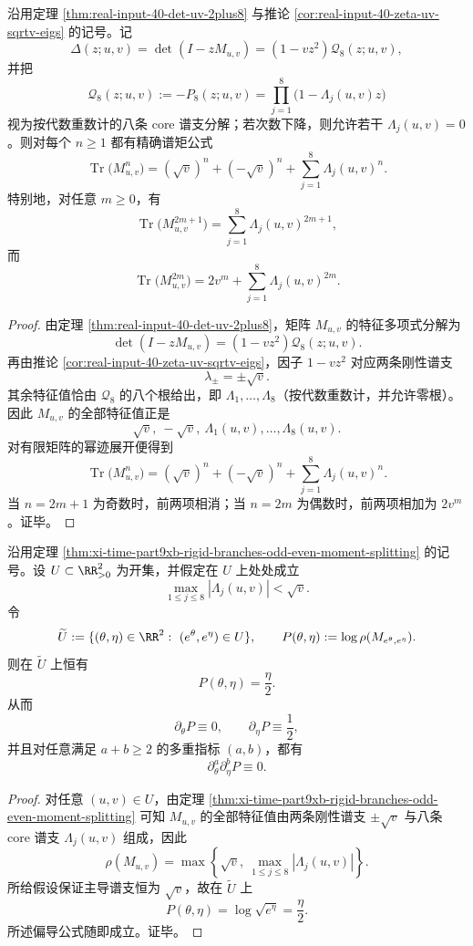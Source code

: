 \begin{theorem}[二维刚性谱支的奇偶矩完全分裂]\label{thm:xi-time-part9xb-rigid-branches-odd-even-moment-splitting}
沿用定理 \ref{thm:real-input-40-det-uv-2plus8} 与推论 \ref{cor:real-input-40-zeta-uv-sqrtv-eigs} 的记号。记
\[
\Delta(z;u,v)=\det(I-zM_{u,v})=(1-vz^2)\mathcal Q_8(z;u,v),
\]
并把
\[
\mathcal Q_8(z;u,v):=-P_8(z;u,v)=\prod_{j=1}^{8}\bigl(1-\Lambda_j(u,v)z\bigr)
\]
视为按代数重数计的八条 core 谱支分解；若次数下降，则允许若干 \(\Lambda_j(u,v)=0\)。则对每个 \(n\ge 1\) 都有精确谱矩公式
\[
\operatorname{Tr}\bigl(M_{u,v}^n\bigr)
=
(\sqrt v)^n+(-\sqrt v)^n+\sum_{j=1}^{8}\Lambda_j(u,v)^n.
\]
特别地，对任意 \(m\ge 0\)，有
\[
\operatorname{Tr}\bigl(M_{u,v}^{2m+1}\bigr)
=
\sum_{j=1}^{8}\Lambda_j(u,v)^{2m+1},
\]
而
\[
\operatorname{Tr}\bigl(M_{u,v}^{2m}\bigr)
=
2v^m+\sum_{j=1}^{8}\Lambda_j(u,v)^{2m}.
\]
\end{theorem}
\begin{proof}
由定理 \ref{thm:real-input-40-det-uv-2plus8}，矩阵 \(M_{u,v}\) 的特征多项式分解为
\[
\det(I-zM_{u,v})=(1-vz^2)\mathcal Q_8(z;u,v).
\]
再由推论 \ref{cor:real-input-40-zeta-uv-sqrtv-eigs}，因子 \(1-vz^2\) 对应两条刚性谱支
\[
\lambda_\pm=\pm\sqrt v.
\]
其余特征值恰由 \(\mathcal Q_8\) 的八个根给出，即 \(\Lambda_1,\dots,\Lambda_8\)（按代数重数计，并允许零根）。因此 \(M_{u,v}\) 的全部特征值正是
\[
\sqrt v,\ -\sqrt v,\ \Lambda_1(u,v),\dots,\Lambda_8(u,v).
\]
对有限矩阵的幂迹展开便得到
\[
\operatorname{Tr}\bigl(M_{u,v}^n\bigr)
=
(\sqrt v)^n+(-\sqrt v)^n+\sum_{j=1}^{8}\Lambda_j(u,v)^n.
\]
当 \(n=2m+1\) 为奇数时，前两项相消；当 \(n=2m\) 为偶数时，前两项相加为 \(2v^m\)。证毕。
\end{proof}

\begin{corollary}[刚性谱支主导区的联合累积量全湮灭]\label{cor:xi-time-part9xb-rigid-branch-dominant-cumulant-vanishing}
沿用定理 \ref{thm:xi-time-part9xb-rigid-branches-odd-even-moment-splitting} 的记号。设 \(U\subset \RR_{>0}^2\) 为开集，并假定在 \(U\) 上处处成立
\[
\max_{1\le j\le 8}|\Lambda_j(u,v)|<\sqrt v.
\]
令
\[
\widetilde U:=\{(\theta,\eta)\in\RR^2:\ (e^\theta,e^\eta)\in U\},
\qquad
P(\theta,\eta):=\log \rho(M_{e^\theta,e^\eta}).
\]
则在 \(\widetilde U\) 上恒有
\[
P(\theta,\eta)=\frac{\eta}{2}.
\]
从而
\[
\partial_\theta P\equiv 0,
\qquad
\partial_\eta P\equiv \frac12,
\]
并且对任意满足 \(a+b\ge 2\) 的多重指标 \((a,b)\)，都有
\[
\partial_\theta^a\partial_\eta^b P\equiv 0.
\]
\end{corollary}
\begin{proof}
对任意 \((u,v)\in U\)，由定理
\ref{thm:xi-time-part9xb-rigid-branches-odd-even-moment-splitting} 可知 \(M_{u,v}\) 的全部特征值由两条刚性谱支 \(\pm\sqrt v\) 与八条 core 谱支 \(\Lambda_j(u,v)\) 组成，因此
\[
\rho(M_{u,v})
=
\max\left\{\sqrt v,\ \max_{1\le j\le 8}|\Lambda_j(u,v)|\right\}.
\]
所给假设保证主导谱支恒为 \(\sqrt v\)，故在 \(\widetilde U\) 上
\[
P(\theta,\eta)=\log\sqrt{e^\eta}=\frac{\eta}{2}.
\]
所述偏导公式随即成立。证毕。
\end{proof}

